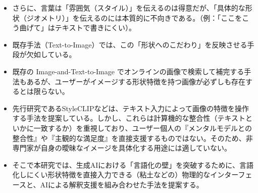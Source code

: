 \documentclass[dvipdfmx]{jlreq}
\begin{document}
\begin{itemize}
  \item さらに、言葉は「雰囲気（スタイル）」を伝えるのは得意だが、「具体的な形状（ジオメトリ）」を伝えるのには本質的に不向きである。（例：「ここをこう曲げて」はテキストで書きにくい）。
  \item 既存手法（Text-to-Image）では、この「形状へのこだわり」を反映させる手段が欠如している。
  \item 既存の Image-and-Text-to-Image でオンラインの画像で検索して補完する手法もあるが、ユーザーがイメージする形状特徴を持つ画像が必ずしも存在するとは限らない。
  \item 先行研究であるStyleCLIPなどは、テキスト入力によって画像の特徴を操作する手法を提案している。しかし、これらは計算機的な整合性（テキストといかに一致するか）を重視しており、ユーザー個人の『メンタルモデルとの整合性』や『主観的な満足度』を直接支援するものではない。そのため、非専門家が自身の曖昧なイメージを具体化する用途には適していない。
  \item そこで本研究では、生成AIにおける「言語化の壁」を突破するために、言語化しにくい形状特徴を直接入力できる（粘土などの）物理的なインターフェースと、AIによる解釈支援を組み合わせた手法を提案する。
\end{itemize}
\end{document}

